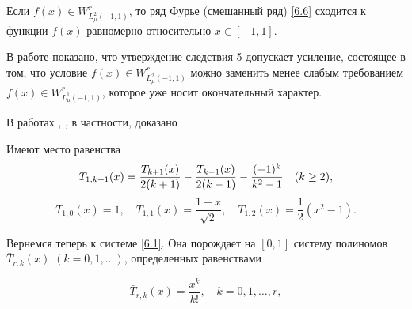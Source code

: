 \begin{corollary}
 Если $f(x)\in W^r_{L^2_\mu(-1,1)}$, то ряд Фурье (смешанный ряд) \eqref{6.6} сходится к функции $f(x)$ равномерно относительно $x\in[-1,1]$.
\end{corollary}

\begin{remark}
В работе \cite{Shar20} показано, что утверждение следствия 5 допускает  усиление, состоящее в том, что  условие $f(x)\in W^r_{L^2_\mu(-1,1)}$ можно заменить менее слабым требованием $f(x)\in W^r_{L^1_\mu(-1,1)}$, которое уже носит окончательный характер.
\end{remark}

В работах \cite{Shar20}, \cite{Shar25}, в частности, доказано
\begin{corollary} Имеют место равенства
\begin{equation}\label{6.8}
T_{1,k+1}(x)={T_{k+1}(x)\over2(k+1)}- {T_{k-1}(x)\over2(k-1)} -\frac{(-1)^k}{k^2-1}\quad (k\ge 2),
\end{equation}
\begin{equation}\label{6.9}
T_{1,0}(x)=1, \quad T_{1,1}(x)=\frac{1+x}{\sqrt{2}}, \quad T_{1,2}(x)=\frac12(x^2-1).
\end{equation}
\end{corollary}
 Вернемся теперь к системе \eqref{6.1}. Она порождает на $[0,1]$ систему полиномов $\bar T_{r,k}(x)$ $(k=0,1,\ldots)$, определенных равенствами

  \begin{equation}\label{6.10}
\bar T_{r,k}(x) =\frac{x^k}{k!}, \quad k=0,1,\ldots, r,
\end{equation}

